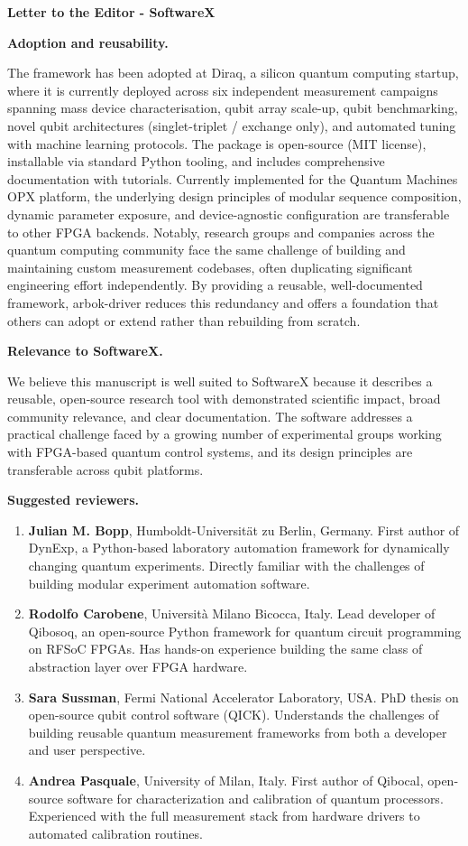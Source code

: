 \documentclass[11pt]{letter}
\newcommand{\heading}[1]{\par\medskip\noindent\textbf{#1}\quad\ignorespaces}
\begin{document}
\begin{letter}{\textbf{Letter to the Editor - SoftwareX}}
\heading{Adoption and reusability.}

The framework has been adopted at Diraq, a silicon quantum computing startup, where it is currently deployed across six independent measurement campaigns spanning mass device characterisation, qubit array scale-up, qubit benchmarking, novel qubit architectures (singlet-triplet / exchange only), and automated tuning with machine learning protocols. The package is open-source (MIT license), installable via standard Python tooling, and includes comprehensive documentation with tutorials. Currently implemented for the Quantum Machines OPX platform, the underlying design principles of modular sequence composition, dynamic parameter exposure, and device-agnostic configuration are transferable to other FPGA backends. Notably, research groups and companies across the quantum computing community face the same challenge of building and maintaining custom measurement codebases, often duplicating significant engineering effort independently. By providing a reusable, well-documented framework, arbok-driver reduces this redundancy and offers a foundation that others can adopt or extend rather than rebuilding from scratch.

\heading{Relevance to SoftwareX.}

We believe this manuscript is well suited to SoftwareX because it describes a reusable, open-source research tool with demonstrated scientific impact, broad community relevance, and clear documentation. The software addresses a practical challenge faced by a growing number of experimental groups working with FPGA-based quantum control systems, and its design principles are transferable across qubit platforms.

\heading{Suggested reviewers.}

\begin{enumerate}
    \item \textbf{Julian M. Bopp}, Humboldt-Universit\"at zu Berlin, Germany. First author of DynExp, a Python-based laboratory automation framework for dynamically changing quantum experiments. Directly familiar with the challenges of building modular experiment automation software.
    \item \textbf{Rodolfo Carobene}, Universit\`a Milano Bicocca, Italy. Lead developer of Qibosoq, an open-source Python framework for quantum circuit programming on RFSoC FPGAs. Has hands-on experience building the same class of abstraction layer over FPGA hardware.
    \item \textbf{Sara Sussman}, Fermi National Accelerator Laboratory, USA. PhD thesis on open-source qubit control software (QICK). Understands the challenges of building reusable quantum measurement frameworks from both a developer and user perspective.
    \item \textbf{Andrea Pasquale}, University of Milan, Italy. First author of Qibocal, open-source software for characterization and calibration of quantum processors. Experienced with the full measurement stack from hardware drivers to automated calibration routines.
\end{enumerate}


\end{letter}
\end{document}
